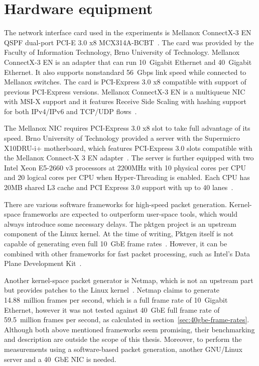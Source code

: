 
\section{Hardware equipment}\label{sec:analysis-hardware}
The network interface card used in the experiments is
Mellanox ConnectX-3 EN QSPF dual-port PCI-E 3.0 x8 MCX314A-BCBT~\cite{mellanox-product-brief}.
The card was provided by the Faculty of Information Technology, Brno University of Technology.
Mellanox ConnectX-3 EN is an adapter that can run 10~Gigabit Ethernet and 40~Gigabit Ethernet.
It also supports nonstandard 56~Gbps link speed while connected to Mellanox switches.
The card is PCI-Express 3.0 x8 compatible with support of previous PCI-Express versions.
Mellanox ConnectX-3 EN is a multiqueue NIC with MSI-X support %
and it features Receive Side Scaling with hashing support for both IPv4/IPv6 and TCP/UDP flows~\cite{mellanox-user-manual}.

The Mellanox NIC requires PCI-Express 3.0 x8 slot to take full advantage of its speed.
Brno University of Technology provided a server with
the Supermicro X10DRU-i+ motherboard, which
features PCI-Express 3.0 slots compatible with the Mellanox Connect-X 3 EN adapter~\cite{supermicro-board}.
The server is further equipped with two Intel Xeon E5-2660 v3 processors at 2200MHz with 10 physical cores per CPU
and 20 logical cores per CPU when Hyper-Threading is enabled.
Each CPU has 20MB shared L3 cache and PCI Express 3.0 support with up to 40 lanes~\cite{intel-xeon-cpu}.

There are various software frameworks for high-speed packet generation.
Kernel-space frameworks are expected to outperform user-space tools, which would always introduce some necessary delays.
The pktgen project is an upstream component of the Linux kernel.
At the time of writing, Pktgen itself is not capable of generating even full 10~GbE frame rates~\cite{netmap}.
However, it can be combined with other frameworks for fast packet processing, such as
Intel's Data Plane Development Kit~\cite{dpdk}.

Another kernel-space packet generator is Netmap,
which is not an upstream part but provides patches to the Linux kernel~\cite{netmap}.
Netmap claims to generate 14.88~million frames per second, which is a full frame rate of 10~Gigabit Ethernet,
however it was not tested against 40~GbE full frame rate of 59.5~million frames per second,
as calculated in section~\ref{sec:40gbe-frame-rates}.
Although both above mentioned frameworks seem promising, their benchmarking and description
are outside the scope of this thesis.
Moreover, to perform the measurements using a software-based packet generation,
another GNU/Linux server and a 40~GbE NIC is needed.

